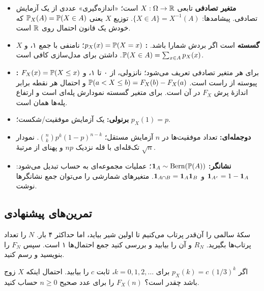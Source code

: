 \begin{summary}
\begin{itemize}
  \item \textbf{متغیر تصادفی} تابعی $X:\Omega\to\R$ است؛ «اندازه‌گیری» عددی از یک آزمایش تصادفی. پیشامدها: $\{X\in A\}=X^{-1}(A)$. توزیع $X$ یعنی $\P_X(A)=\P(X\in A)$ که خودش یک قانون احتمال روی $\R$ است.
  \item $X$ \textbf{گسسته} است اگر بردش شمارا باشد. \textbf{:} $p_X(x)=\P(X=x)$؛ نامنفی با جمع ۱، و $\P(X\in A)=\sum_{x\in A}p_X(x)$. داشتن  برای مدل‌سازی کافی است.
  \item \textbf{:} $F_X(x)=\P(X\le x)$ برای هر متغیر تصادفی تعریف می‌شود؛ نانزولی، از ۰ تا ۱، و پیوسته از راست است. $\P(a<X\le b)=F_X(b)-F_X(a)$ و احتمال هر نقطه برابر اندازهٔ پرش $F_X$ در آن است. برای متغیر گسسته نمودارش پله‌ای است و ارتفاع پله‌ها همان  است.
  \item \textbf{برنولی:} یک آزمایش موفقیت/شکست؛ $p_X(1)=p$.
  \item \textbf{دوجمله‌ای:} تعداد موفقیت‌ها در $n$ آزمایش مستقل؛ $\binom nkp^k(1-p)^{n-k}$. نمودار تک‌قله‌ای با قله نزدیک $np$ و پهنای از مرتبهٔ $\sqrt n$.
  \item \textbf{نشانگر:} $\ind_A\sim\mathrm{Bern}(\P(A))$؛ عملیات مجموعه‌ای به حساب تبدیل می‌شود: $\ind_{A^c}=1-\ind_A$ و $\ind_{A\cap B}=\ind_A\ind_B$. متغیرهای شمارشی را می‌توان جمع نشانگرها نوشت.
\end{itemize}
\end{summary}

\subsection*{تمرین‌های پیشنهادی}

\begin{exercise}
سکهٔ سالمی را آن‌قدر پرتاب می‌کنیم تا اولین شیر بیاید، اما حداکثر ۴ بار. $N$ را تعداد پرتاب‌ها بگیرید. $R_N$ و  آن را بیابید و بررسی کنید جمع احتمال‌ها ۱ است. سپس $F_N$ را بنویسید و رسم کنید.
\end{exercise}

\begin{exercise}
اگر $p_X(k)=c\,(1/3)^k$ برای $k=0,1,2,\dots$، ثابت $c$ را بیابید. احتمال اینکه $X$ زوج باشد چقدر است؟ $F_X(n)$ را برای عدد صحیح $n\ge0$ حساب کنید.
\end{exercise}

